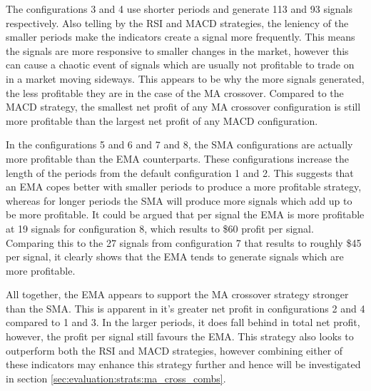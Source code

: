 The configurations 3 and 4 use shorter periods and generate 113 and 93 signals respectively. Also telling by the RSI and MACD strategies, the leniency of the smaller periods make the indicators create a signal more frequently. This means the signals are more responsive to smaller changes in the market, however this can cause a chaotic event of signals which are usually not profitable to trade on in a market moving sideways. This appears to be why the more signals generated, the less profitable they are in the case of the MA crossover. Compared to the MACD strategy, the smallest net profit of any MA crossover configuration is still more profitable than the largest net profit of any MACD configuration.

In the configurations 5 and 6 and 7 and 8, the SMA configurations are actually more profitable than the EMA counterparts. These configurations increase the length of the periods from the default configuration 1 and 2. This suggests that an EMA copes better with smaller periods to produce a more profitable strategy, whereas for longer periods the SMA will produce more signals which add up to be more profitable. It could be argued that per signal the EMA is more profitable at 19 signals for configuration 8, which results to \$60 profit per signal. Comparing this to the 27 signals from configuration 7 that results to roughly \$45 per signal, it clearly shows that the EMA tends to generate signals which are more profitable.

All together, the EMA appears to support the MA crossover strategy stronger than the SMA. This is apparent in it's greater net profit in configurations 2 and 4 compared to 1 and 3. In the larger periods, it does fall behind in total net profit, however, the profit per signal still favours the EMA. This strategy also looks to outperform both the RSI and MACD strategies, however combining either of these indicators may enhance this strategy further and hence will be investigated in section \ref{sec:evaluation:strats:ma_cross_combs}.




